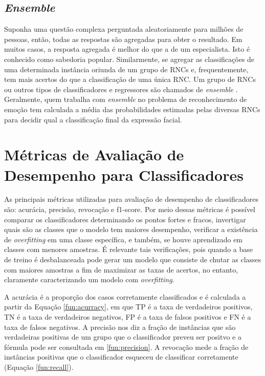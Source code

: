 \subsection{\textit{Ensemble}}
Suponha uma questão complexa perguntada aleatoriamente para milhões de pessoas, então, todas as respostas são agregadas para obter o resultado. Em muitos casos, a resposta agregada é melhor do que a de um especialista. Isto é conhecido como sabedoria popular. Similarmente, se agregar as classificações de uma determinada instância oriunda de um grupo de RNCs e, frequentemente, tem mais acertos do que a classificação de uma única RNC. Um grupo de RNCs ou outros tipos de classificadores e regressores são chamados de \textit{ensemble} \citep{geron2017hands}. Geralmente, quem trabalha com \textit{ensemble} no problema de reconhecimento de emoção tem calculada a média das probabilidades estimadas pelas diversas RNCs para decidir qual a classificação final da expressão facial.

\section{Métricas de Avaliação de Desempenho para Classificadores}\label{sec:metavalclass}
As principais métricas utilizadas para avaliação de desempenho de classificadores são: acurácia, precisão, revocação e f1-score. Por meio dessas métricas é possível comparar os classificadores determinando os pontos fortes e fracos, invertigar quais são as classes que o modelo tem maiores desempenho, verificar a existência de \textit{overfitting} em uma classe específica, e também, se houve aprendizado em classes com menores amostras. É relevante tais verificações, pois quando a base de treino é desbalanceada pode gerar um modelo que consiste de chutar as classes com maiores amostras a fim de maximizar as taxas de acertos, no entanto, claramente caracterizando um modelo com \textit{overfitting}.

A acurácia é a proporção dos casos corretamente classificados e é calculada a partir da Equação \ref{fun:acurracy}, em que TP é a taxa de verdadeiros positivos, TN é a taxa de verdadeiros negativos, FP é a taxa de falsos positivos e FN é a taxa de falsos negativos. A precisão nos diz a fração de instâncias que são verdadeiras positivas de um grupo que o classificador preveu ser positvo e a fórmula pode ser consultada em \ref{fun:precision}. A revocação mede a fração de instâncias positivas que o classificador esqueceu de classificar corretamente (Equação \ref{fun:recall}). 

